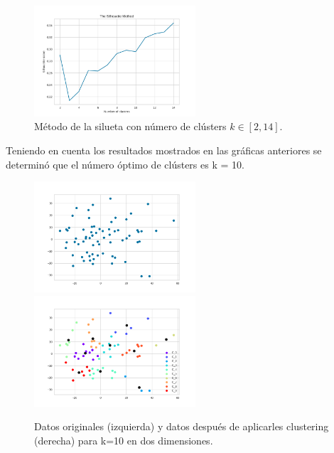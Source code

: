 \documentclass[10pt, a4paper]{article}
\begin{document}
		\begin{figure}[H]
			\centering
			\includegraphics[width = 6cm]{SilhouetteM_bf.png}
			\caption{M\'etodo de la silueta con n\'umero de cl\'usters $k\in[2, 14]$.}
		\end{figure}
		
		Teniendo en cuenta los resultados mostrados en las gr\'aficas anteriores se determin\'o que el n\'umero \'optimo de cl\'usters es k = 10. 
		
		\begin{figure}[H]
			\centering
			\includegraphics[width = 6cm]{Original_Data_2d_bf.png}
			\includegraphics[width = 6cm]{Clustered_Data_2d_k10_seed45_bf.png}
			\caption{Datos originales (izquierda) y datos despu\'es de aplicarles clustering (derecha) para k=10 en dos dimensiones.}
		\end{figure}
		
\end{document}
